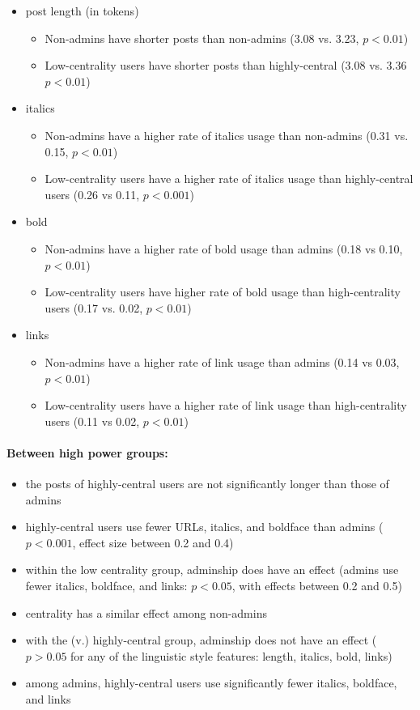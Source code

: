 \documentclass[12pt]{scrartcl}
\begin{document}
\begin{itemize}
  \item post length (in tokens)
    \begin{itemize}
      \item Non-admins have shorter posts than non-admins (3.08 vs. 3.23, $p < 0.01$)
      \item Low-centrality users have shorter posts than highly-central (3.08 vs. 3.36 $p < 0.01$)
    \end{itemize}
  \item italics
    \begin{itemize}
      \item Non-admins have a higher rate of italics usage than non-admins (0.31 vs. 0.15, $p<0.01$)
      \item Low-centrality users have a higher rate of italics usage than highly-central users (0.26 vs 0.11, $p<0.001$)
    \end{itemize}
  \item bold
    \begin{itemize}
      \item Non-admins have a higher rate of bold usage than admins (0.18 vs 0.10, $p<0.01$)
      \item Low-centrality users have higher rate of bold usage than high-centrality users (0.17 vs. 0.02, $p<0.01$)
    \end{itemize}
  \item links
    \begin{itemize}
      \item Non-admins have a higher rate of link usage than admins (0.14 vs 0.03, $p<0.01$)
      \item Low-centrality users have a higher rate of link usage than high-centrality users (0.11 vs 0.02, $p<0.01$)
    \end{itemize}
\end{itemize}

\paragraph{Between high power groups:}
\begin{itemize}
  \item the posts of highly-central users are not significantly longer than those of admins
  \item highly-central users use fewer URLs, italics, and boldface than admins ($p < 0.001$, effect size between 0.2 and 0.4)
  \item within the low centrality group, adminship does have an effect (admins use fewer italics, boldface, and links: $p < 0.05$, with effects between 0.2 and 0.5)
  \item centrality has a similar effect among non-admins
  \item with the (v.) highly-central group, adminship does not have an effect ($p > 0.05$ for any of the linguistic style features: length, italics, bold, links)
  \item among admins, highly-central users use significantly fewer italics, boldface, and links
\end{itemize}
\end{document}
